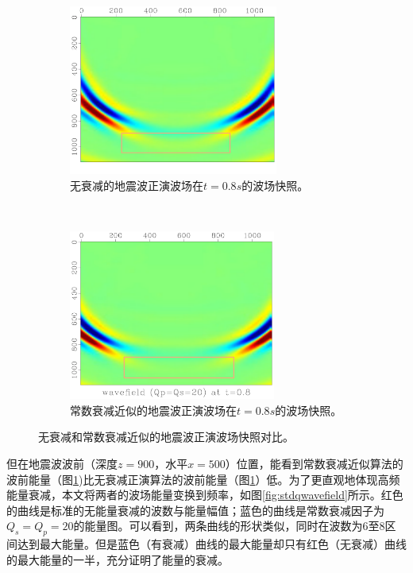 \documentclass[degree=doctor]{thuthesis}
\begin{document}
\begin{figure}[ht]
    \centering
    \begin{subfigure}[b]{0.5\textwidth}
        \centering
        \includegraphics[height=2.2in]{std.pdf}
        \caption{无衰减的地震波正演波场在$t=0.8s$的波场快照。}
        \label{fig:无衰减的地震波正演波场在$t=0.8s$的波场快照。}
    \end{subfigure}%
    ~
    \begin{subfigure}[b]{0.5\textwidth}
        \centering
        \includegraphics[height=2.2in]{q20.pdf}
        \caption{常数衰减近似的地震波正演波场在$t=0.8s$的波场快照。}
        \label{fig:常数衰减近似的地震波正演波场在$t=0.8s$的波场快照。}
    \end{subfigure}
    \caption{无衰减和常数衰减近似的地震波正演波场快照对比。}
    \label{fig:qwavefield}
\end{figure}

但在地震波波前（深度$z=900$，水平$x=500$）位置，能看到常数衰减近似算法的波前能量（图\ref{fig:无衰减的地震波正演波场在$t=0.8s$的波场快照。})比无衰减正演算法的波前能量（图\ref{fig:无衰减的地震波正演波场在$t=0.8s$的波场快照。}）低。为了更直观地体现高频能量衰减，本文将两者的波场能量变换到频率，如图\ref{fig:stdqwavefield}所示。红色的曲线是标准的无能量衰减的波数与能量幅值；蓝色的曲线是常数衰减因子为$Q_s=Q_p=20$的能量图。可以看到，两条曲线的形状类似，同时在波数为6至8区间达到最大能量。但是蓝色（有衰减）曲线的最大能量却只有红色（无衰减）曲线的最大能量的一半，充分证明了能量的衰减。
\end{document}
